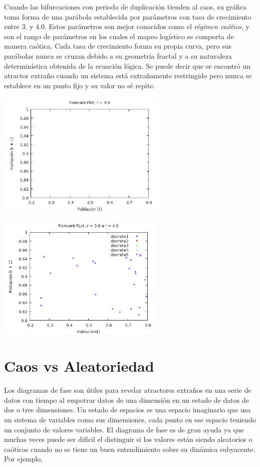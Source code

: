 \documentclass{article}
\begin{document}
Cuando las bifurcaciones con periodo de duplicación tienden al caos, su gráfica toma forma de una parábola establecida por parámetros con tasa de crecimiento entre 3. y 4.0. Estos parámetros son mejor conocidos como el \textit{régimen caótico}, y son el rango de parámetros en los cuales el mapeo logístico se comporta de manera caótica. Cada tasa de crecimiento forma su propia curva, pero sus parábolas nunca se cruzan debido a su geometría fractal y a su naturaleza determinística obtenida de la ecuación lógica. Se puede decir que se encontró un atractor extraño cuando un sistema está extrañamente restringido pero nunca se establece en un punto fijo y su valor no sé repite.
	\begin{center}
    \includegraphics[height=6cm]{graf8.png}
    \end{center}
    \begin{center}
    \includegraphics[height=6cm]{graf9.png}
    \end{center}
    
\section{Caos vs Aleatoriedad}
Los diagramas de fase son útiles para revelar atractores extraños en una serie de datos con tiempo al empotrar datos de una dimensión en un estado de datos de dos o tres dimensiones. Un estado de espacios es una espacio imaginario que usa un sistema de variables como sus dimensiones, cada punto en ese espacio teniendo un conjunto de valores variables. El diagrama de fase es de gran ayuda ya que muchas veces puede ser difícil el distinguir si los valores están siendo aleatorios o caóticos cuando no se tiene un buen entendimiento sobre su dinámica subyacente. Por ejemplo,
\end{document}
